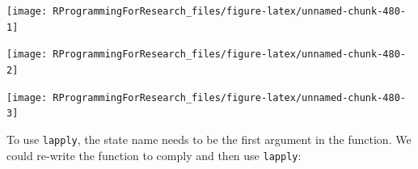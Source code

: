 \documentclass[]{book}
\begin{document}
\begin{center}\texttt{[image: RProgrammingForResearch\_files/figure-latex/unnamed-chunk-480-1]} \end{center}

\begin{center}\texttt{[image: RProgrammingForResearch\_files/figure-latex/unnamed-chunk-480-2]} \end{center}

\begin{center}\texttt{[image: RProgrammingForResearch\_files/figure-latex/unnamed-chunk-480-3]} \end{center}

To use \texttt{lapply}, the state name needs to be the first argument in
the function. We could re-write the function to comply and then use
\texttt{lapply}:
\end{document}
